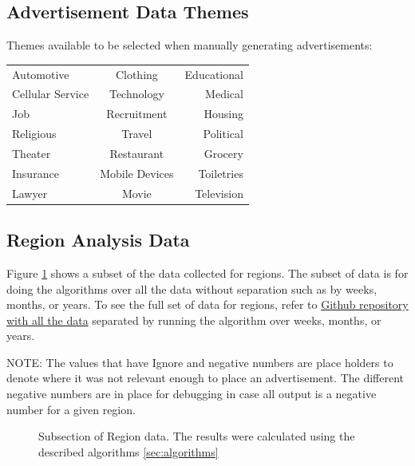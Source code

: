 \documentclass[titlepage,twocolumn]{article}
\begin{document}
\subsection{Advertisement Data Themes}
\label{app:adThemes}
\par Themes available to be selected when manually generating advertisements:
\begin{center}
\begin{tabular} { l c r}
	Automotive & Clothing & Educational \\ 
	Cellular Service & Technology & Medical \\
	Job & Recruitment & Housing \\
	Religious & Travel & Political \\
    Theater & Restaurant & Grocery \\ 
    Insurance & Mobile Devices & Toiletries \\
     Lawyer & Movie & Television \\
\end{tabular}
\end{center}

\onecolumn
\subsection{Region Analysis Data}
\label{seg:regionAnalysisData}
	\par Figure \ref{tab:subTableRegion} shows a subset of the data collected for regions. The subset of data is for doing the algorithms over all the data without separation such as by weeks, months, or years. To see the full set of data for regions, refer to \href{https://github.com/gateslm/CSSE-Senior-Thesis/blob/master/Results/finalResultRegion.xlsx}{Github repository with all the data} separated by running the algorithm over weeks, months, or years.

\par NOTE: The values that have Ignore and negative numbers are place holders to denote where it was not relevant enough to place an advertisement. The different negative numbers are in place for debugging in case all output is a negative number for  a given region.

\begin{figure}[htbp]
	\centering
	
  \label{tab:subTableRegion}%
\caption{Subsection of Region data. The results were calculated using the described algorithms \ref{sec:algorithms} }
\end{figure}%
\end{document}
